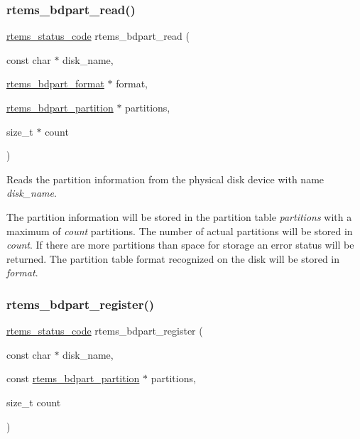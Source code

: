 \subsubsection{\texorpdfstring{rtems\_bdpart\_read()}{rtems\_bdpart\_read()}}
{\footnotesize\ttfamily \mbox{\hyperlink{group__ClassicStatus_ga545d41846817eaba6143d52ee4d9e9fe}{rtems\+\_\+status\+\_\+code}} rtems\+\_\+bdpart\+\_\+read (\begin{DoxyParamCaption}\item[{const char $\ast$}]{disk\+\_\+name,  }\item[{\mbox{\hyperlink{unionrtems__bdpart__format}{rtems\+\_\+bdpart\+\_\+format}} $\ast$}]{format,  }\item[{\mbox{\hyperlink{structrtems__bdpart__partition}{rtems\+\_\+bdpart\+\_\+partition}} $\ast$}]{partitions,  }\item[{size\+\_\+t $\ast$}]{count }\end{DoxyParamCaption})}



Reads the partition information from the physical disk device with name {\itshape disk\+\_\+name}. 

The partition information will be stored in the partition table {\itshape partitions} with a maximum of {\itshape count} partitions. The number of actual partitions will be stored in {\itshape count}. If there are more partitions than space for storage an error status will be returned. The partition table format recognized on the disk will be stored in {\itshape format}. \mbox{\label{group__rtems__bdpart_ga36d215715c22ca86ce71f977ed760f4c}} 
\subsubsection{\texorpdfstring{rtems\_bdpart\_register()}{rtems\_bdpart\_register()}}
{\footnotesize\ttfamily \mbox{\hyperlink{group__ClassicStatus_ga545d41846817eaba6143d52ee4d9e9fe}{rtems\+\_\+status\+\_\+code}} rtems\+\_\+bdpart\+\_\+register (\begin{DoxyParamCaption}\item[{const char $\ast$}]{disk\+\_\+name,  }\item[{const \mbox{\hyperlink{structrtems__bdpart__partition}{rtems\+\_\+bdpart\+\_\+partition}} $\ast$}]{partitions,  }\item[{size\+\_\+t}]{count }\end{DoxyParamCaption})}



